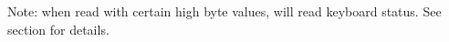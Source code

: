 Note: when read with certain high byte values,  will read keyboard status. See section  for details.


\subsubsection{}


\subsubsection{}
\vspace*{-2ex}
\subsubsection{}
\vspace*{-2ex}
\subsubsection{}
\vspace*{-2ex}
\subsubsection{}
\vspace*{-2ex}
\subsubsection{}
\vspace*{-2ex}
\subsubsection{}



\pagebreak
\IntentionallyEmpty
\pagebreak
